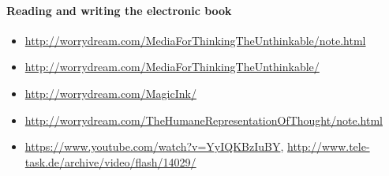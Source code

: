 \documentclass{article}
\begin{document}
\paragraph{Reading and writing the electronic book~\cite{marshall2009reading}}

\begin{itemize}
\item \url{http://worrydream.com/MediaForThinkingTheUnthinkable/note.html}
\item \url{http://worrydream.com/MediaForThinkingTheUnthinkable/}
\item \url{http://worrydream.com/MagicInk/}
\item \url{http://worrydream.com/TheHumaneRepresentationOfThought/note.html}
\item \url{https://www.youtube.com/watch?v=YyIQKBzIuBY}, \url{http://www.tele-task.de/archive/video/flash/14029/}
\end{itemize}


\end{document}
